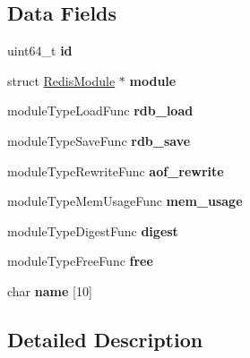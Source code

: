 \subsection*{Data Fields}
\begin{DoxyCompactItemize}
\item 
\mbox{\label{structRedisModuleType_ac21bc5854da3d77ce8b8dc5a1c46f6d9}} 
uint64\+\_\+t {\bfseries id}
\item 
\mbox{\label{structRedisModuleType_aa61600daf63402137e7bba63af922c13}} 
struct \hyperlink{structRedisModule}{Redis\+Module} $\ast$ {\bfseries module}
\item 
\mbox{\label{structRedisModuleType_a2c0e490af26287ef2840a9b5d81b5d27}} 
module\+Type\+Load\+Func {\bfseries rdb\+\_\+load}
\item 
\mbox{\label{structRedisModuleType_acc8570eb2af9c01afbdef0dadb889559}} 
module\+Type\+Save\+Func {\bfseries rdb\+\_\+save}
\item 
\mbox{\label{structRedisModuleType_aa2bd171443a23132fea790e3a7b584a7}} 
module\+Type\+Rewrite\+Func {\bfseries aof\+\_\+rewrite}
\item 
\mbox{\label{structRedisModuleType_a8619a7d6ada90e18888bc1ae2e97c8fc}} 
module\+Type\+Mem\+Usage\+Func {\bfseries mem\+\_\+usage}
\item 
\mbox{\label{structRedisModuleType_ad90362907e3d6e2d3f9bcc4536f3b8c7}} 
module\+Type\+Digest\+Func {\bfseries digest}
\item 
\mbox{\label{structRedisModuleType_ad8790381b96825ff1ae3201b2942b2e1}} 
module\+Type\+Free\+Func {\bfseries free}
\item 
\mbox{\label{structRedisModuleType_ac3a27f8a26dbc2775bcdeb6ad8a26dca}} 
char {\bfseries name} \mbox{[}10\mbox{]}
\end{DoxyCompactItemize}


\subsection{Detailed Description}


